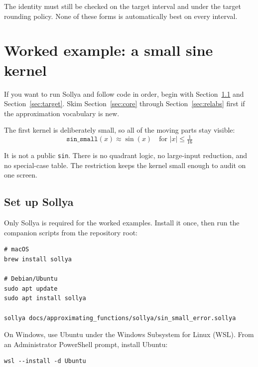 \documentclass[manuscript, nonacm]{acmart}
\begin{document}
    The identity must still be checked on the target interval and under the
    target rounding policy. None of these forms is automatically best on every
    interval.



    \section{Worked example: a small sine kernel}

    \begin{tcolorbox}[colback=blue!5, colframe=blue!30, title={Start here for hands-on work}]
        If you want to run Sollya and follow code in order, begin with
        Section~\ref{sec:setup} and Section~\ref{sec:target}.
        Skim Section~\ref{sec:core} through Section~\ref{sec:relabs} first if the
        approximation vocabulary is new.
    \end{tcolorbox}

    The first kernel is deliberately small, so all of the moving parts stay visible:
    \[
        \texttt{sin\_small}(x) \approx \sin(x) \quad \text{for } |x| \le \tfrac{1}{16}
    \]

    It is not a public \texttt{sin}. There is no quadrant logic, no large-input
    reduction, and no special-case table. The restriction keeps the kernel small
    enough to audit on one screen.

    \subsection{Set up Sollya}
    \label{sec:setup}

    Only Sollya is required for the worked examples. Install it once, then run
    the companion scripts from the repository root:

    \begin{lstlisting}[style=shell]
# macOS
brew install sollya

# Debian/Ubuntu
sudo apt update
sudo apt install sollya

sollya docs/approximating_functions/sollya/sin_small_error.sollya
    \end{lstlisting}

    On Windows, use Ubuntu under the Windows Subsystem for Linux (WSL). From an
    Administrator PowerShell prompt, install Ubuntu:

    \begin{lstlisting}[style=shell]
wsl --install -d Ubuntu
    \end{lstlisting}
\end{document}
